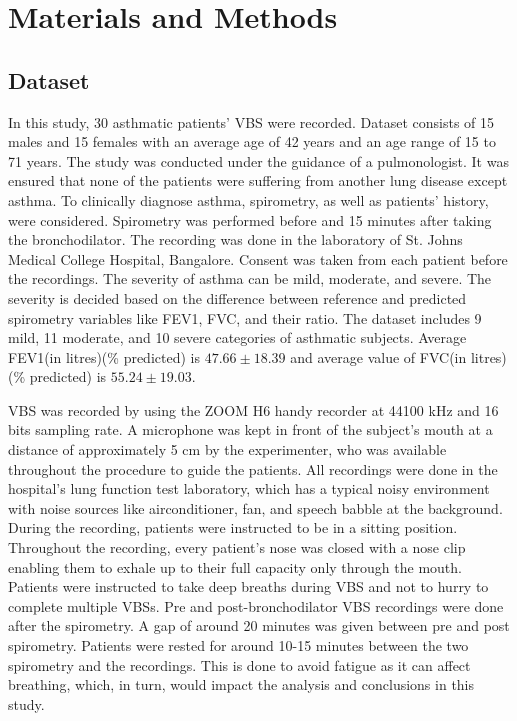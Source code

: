 \documentclass{article}
\begin{document}
\section{Materials and Methods}
\subsection{Dataset}
In this study, 30 asthmatic patients' VBS were recorded. Dataset consists of 15 males and 15 females with an average age of 42 years and an age range of 15 to 71 years. The study was conducted under the guidance of a pulmonologist. It was ensured that none of the patients were suffering from another lung disease except asthma. To clinically diagnose asthma, spirometry, as well as patients' history, were considered. Spirometry was performed before and 15 minutes after taking the bronchodilator. The recording was done in the laboratory of St. Johns Medical College Hospital, Bangalore. Consent was taken from each patient before the recordings. The severity of asthma can be mild, moderate, and severe. The severity is decided based on the difference between reference and predicted spirometry variables like FEV1, FVC, and their ratio. The dataset includes 9 mild, 11 moderate, and 10 severe categories of asthmatic subjects. Average FEV1(in litres)(\% predicted)  is $47.66 \pm 18.39$ and average value of FVC(in litres)(\% predicted) is $55.24 \pm 19.03$.

VBS was recorded by using the ZOOM H6 handy recorder at 44100 kHz and 16 bits sampling rate. A microphone was kept in front of the subject's mouth at a distance of approximately 5 cm by the experimenter, who was available throughout the procedure to guide the patients. All recordings were done in the hospital's lung function test laboratory, which has a typical noisy environment with noise sources like airconditioner, fan, and speech babble at the background. During the recording, patients were instructed to be in a sitting position. Throughout the recording, every patient's nose was closed with a nose clip enabling them to exhale up to their full capacity only through the mouth. Patients were instructed to take deep breaths during VBS and not to hurry to complete multiple VBSs. Pre and post-bronchodilator VBS recordings were done after the spirometry. A gap of around 20 minutes was given between pre and post spirometry. Patients were rested for around 10-15 minutes between the two spirometry and the recordings. This is done to avoid fatigue as it can affect breathing, which, in turn, would impact the analysis and conclusions in this study.
\end{document}
